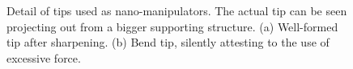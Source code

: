 		\begin{figure}[htp]
			\begin{subfigure}[t]{ 0.49\linewidth}
				\centering
				\caption{}
				\label{subfig::nanomanipulator_tip}
			\end{subfigure}
			\hfill
			\begin{subfigure}[t]{ 0.49\linewidth}
				\centering
				\caption{}
				\label{subfig::nanomanipulator_tip_bent}
			\end{subfigure}
			\caption[Detail of nano-manipulator tips]{Detail of tips used as nano-manipulators. The actual tip can be seen projecting out from a bigger supporting structure. (a) Well-formed tip after sharpening. (b) Bend tip, silently attesting to the use of excessive force.}
		\end{figure}

